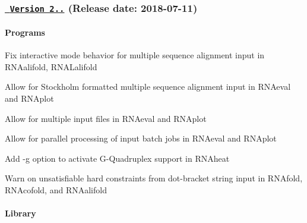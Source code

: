\subsubsection*{\href{https://github.com/ViennaRNA/ViennaRNA/compare/v2.4.8...v2.4.9}{\texttt{ Version 2..}} (Release date\+: 2018-\/07-\/11)}

\paragraph*{Programs}


\begin{DoxyItemize}
\item Fix interactive mode behavior for multiple sequence alignment input in {\ttfamily R\+N\+Aalifold}, {\ttfamily R\+N\+A\+Lalifold}
\item Allow for Stockholm formatted multiple sequence alignment input in {\ttfamily R\+N\+Aeval} and {\ttfamily R\+N\+Aplot}
\item Allow for multiple input files in {\ttfamily R\+N\+Aeval} and {\ttfamily R\+N\+Aplot}
\item Allow for parallel processing of input batch jobs in {\ttfamily R\+N\+Aeval} and {\ttfamily R\+N\+Aplot}
\item Add {\ttfamily -\/g} option to activate G-\/\+Quadruplex support in {\ttfamily R\+N\+Aheat}
\item Warn on unsatisfiable hard constraints from dot-\/bracket string input in {\ttfamily R\+N\+Afold}, {\ttfamily R\+N\+Acofold}, and {\ttfamily R\+N\+Aalifold}
\end{DoxyItemize}

\paragraph*{Library}


